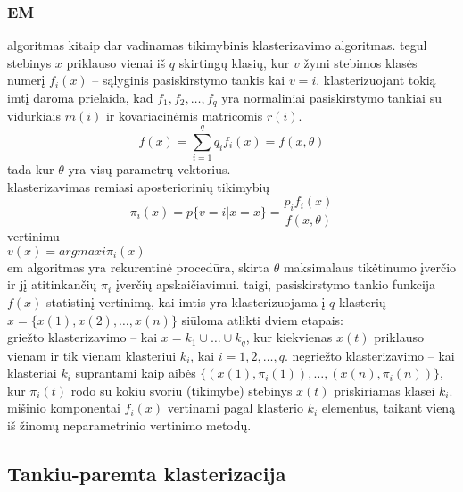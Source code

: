\documentclass{VUMIFInfKursinis}
\begin{document}
		\subsubsection{EM}
			 algoritmas kitaip dar vadinamas tikimybinis klasterizavimo algoritmas.  tegul stebinys $x$ priklauso vienai iš $q$ skirtingų klasių, kur $v$ žymi stebimos klasės numerį $f_i(x)$ – sąlyginis pasiskirstymo tankis kai $v = i$. klasterizuojant tokią imtį daroma prielaida, kad $f_1,f_2,\ldots,f_q$ yra normaliniai pasiskirstymo tankiai su vidurkiais $m(i)$ ir kovariacinėmis matricomis $r(i)$.\\
			\begin{equation}
				f(x)=\sum^q_{i=1} {q_i f_i (x) = f(x, \theta)}
			\end{equation} 
			tada
			kur $\theta$ yra visų parametrų vektorius.\\
			klasterizavimas remiasi aposteriorinių tikimybių
			\begin{equation}
				\pi_i (x) = p\{v = i |x = x\} = \frac{p_i f_i(x)}{f(x,\theta)}
			\end{equation} 
			vertinimu\\
			$v(x) = argmaxi \pi_i(x)$\\
			em algoritmas yra rekurentinė procedūra, skirta $\theta$ maksimalaus tikėtinumo įverčio ir jį atitinkančių $\pi_i$ įverčių apskaičiavimui.
			taigi, pasiskirstymo tankio funkcija $f(x)$ statistinį vertinimą, kai imtis yra klasterizuojama į $q$ klasterių $x = \{x(1), x(2), \ldots, x(n)\}$ siūloma atlikti dviem etapais:\\
			griežto klasterizavimo – kai $x = k_1\cup  \ldots \cup k_q$, kur kiekvienas $x(t)$ priklauso vienam ir tik vienam klasteriui $k_i$, kai $i = 1, 2, \ldots, q$.
			negriežto klasterizavimo – kai klasteriai $k_i$ suprantami kaip aibės $\{(x(1), \pi_i (1)), \ldots, (x(n), \pi_i(n))\}$, kur $\pi_i(t)$ rodo su kokiu svoriu (tikimybe) stebinys $x(t)$ priskiriamas klasei $k_i$. mišinio komponentai $f_i(x)$ vertinami pagal klasterio $k_i$ elementus, taikant vieną iš žinomų neparametrinio vertinimo metodų.

	\subsection{Tankiu-paremta klasterizacija}
\end{document}
